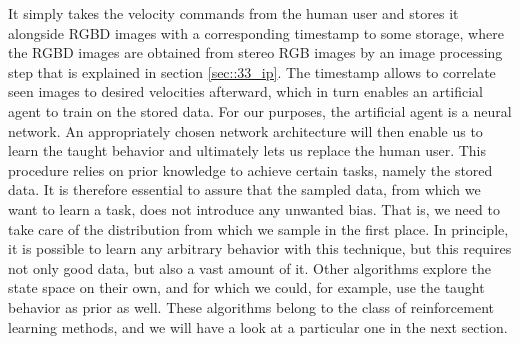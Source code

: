 It simply takes the velocity commands from the human user and stores it alongside RGBD images with a corresponding timestamp to some storage, where the RGBD images are obtained from stereo RGB images by an image processing step that is explained in section \ref{sec::33_ip}. The timestamp allows to correlate seen images to desired velocities afterward, which in turn enables an artificial agent to train on the stored data. For our purposes, the artificial agent is a neural network. An appropriately chosen network architecture will then enable us to learn the taught behavior and ultimately lets us replace the human user. This procedure relies on prior knowledge to achieve certain tasks, namely the stored data. It is therefore essential to assure that the sampled data, from which we want to learn a task, does not introduce any unwanted bias. That is, we need to take care of the distribution from which we sample in the first place. In principle, it is possible to learn any arbitrary behavior with this technique, but this requires not only good data, but also a vast amount of it. Other algorithms explore the state space on their own, and for which we could, for example, use the taught behavior as prior as well. These algorithms belong to the class of reinforcement learning methods, and we will have a look at a particular one in the next section.